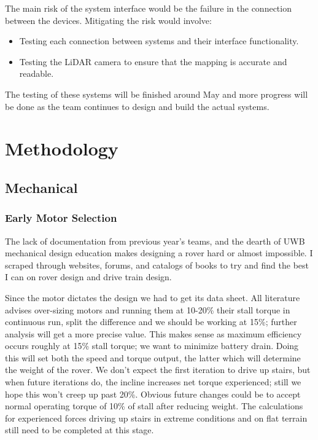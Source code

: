 \documentclass[a4paper, 10pt]{article}
\begin{document}
		The main risk of the system interface would be the failure in the connection between the devices. Mitigating the risk would involve:

		\begin{itemize}
			\item
			Testing each connection between systems and their interface functionality.

			\item
			Testing the LiDAR camera to ensure that the mapping is accurate and readable. 
		\end{itemize}

		The testing of these systems will be finished around May and more progress will be done as the team continues to design and build the actual systems.
 		
 		
\section{Methodology}
	\subsection{Mechanical}
		\subsubsection*{Early Motor Selection}
		The lack of documentation from previous year's teams, and the dearth of UWB mechanical design education makes designing a rover hard or almost impossible. I scraped through websites, forums, and catalogs of books to try and find the best I can on rover design and drive train design. 
	
		Since the motor dictates the design we had to get its data sheet. All literature advises over-sizing motors and running them at 10-20\% their stall torque in continuous run, split the difference and we should be working at 15\%; further analysis will get a more precise value. This makes sense as maximum efficiency occurs roughly at 15\% stall torque; we want to minimize battery drain. Doing this will set both the speed and torque output, the latter which will determine the weight of the rover. We don't expect the first iteration to drive up stairs, but when future iterations do, the incline increases net torque experienced; still we hope this won't creep up past 20\%. Obvious future changes could be to accept normal operating torque of 10\% of stall after reducing weight. The calculations for experienced forces driving up stairs in extreme conditions and on flat terrain still need to be completed at this stage.
		
\end{document}
